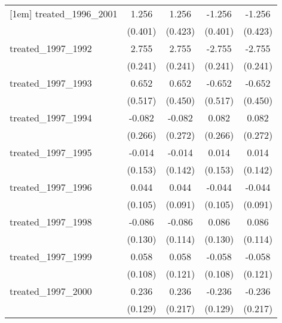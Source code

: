 {\begin{tabular}{l*{4}{c}}
[1em]
treated\_1996\_2001&       1.256\sym{**} &       1.256\sym{**} &      -1.256\sym{**} &      -1.256\sym{**} \\
            &     (0.401)         &     (0.423)         &     (0.401)         &     (0.423)         \\
[1em]
treated\_1997\_1992&       2.755\sym{***}&       2.755\sym{***}&      -2.755\sym{***}&      -2.755\sym{***}\\
            &     (0.241)         &     (0.241)         &     (0.241)         &     (0.241)         \\
[1em]
treated\_1997\_1993&       0.652         &       0.652         &      -0.652         &      -0.652         \\
            &     (0.517)         &     (0.450)         &     (0.517)         &     (0.450)         \\
[1em]
treated\_1997\_1994&      -0.082         &      -0.082         &       0.082         &       0.082         \\
            &     (0.266)         &     (0.272)         &     (0.266)         &     (0.272)         \\
[1em]
treated\_1997\_1995&      -0.014         &      -0.014         &       0.014         &       0.014         \\
            &     (0.153)         &     (0.142)         &     (0.153)         &     (0.142)         \\
[1em]
treated\_1997\_1996&       0.044         &       0.044         &      -0.044         &      -0.044         \\
            &     (0.105)         &     (0.091)         &     (0.105)         &     (0.091)         \\
[1em]
treated\_1997\_1998&      -0.086         &      -0.086         &       0.086         &       0.086         \\
            &     (0.130)         &     (0.114)         &     (0.130)         &     (0.114)         \\
[1em]
treated\_1997\_1999&       0.058         &       0.058         &      -0.058         &      -0.058         \\
            &     (0.108)         &     (0.121)         &     (0.108)         &     (0.121)         \\
[1em]
treated\_1997\_2000&       0.236         &       0.236         &      -0.236         &      -0.236         \\
            &     (0.129)         &     (0.217)         &     (0.129)         &     (0.217)         \\

\end{tabular}}
